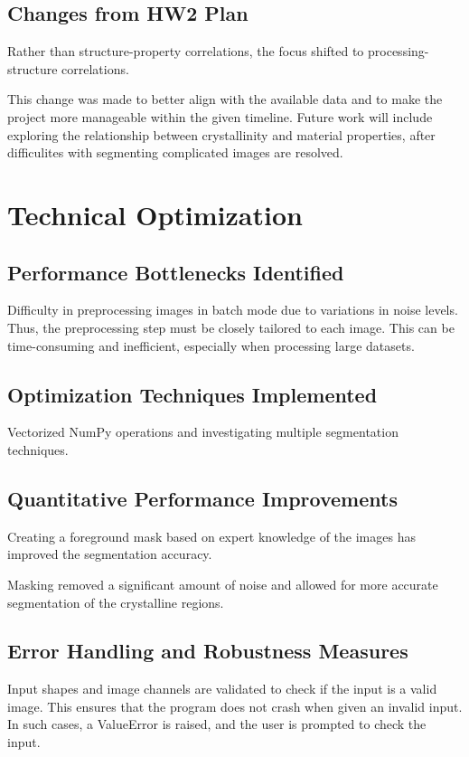 \documentclass[12pt]{article}
\begin{document}
\subsection{Changes from HW2 Plan}
Rather than structure-property correlations, the focus shifted to processing-structure correlations.

This change was made to better align with the available data and to make the project more manageable within the given timeline.
Future work will include exploring the relationship between crystallinity and material properties, after difficulites with 
segmenting complicated images are resolved.

\section{Technical Optimization}

\subsection{Performance Bottlenecks Identified}
Difficulty in preprocessing images in batch mode due to variations in noise levels. Thus, the preprocessing step must be 
closely tailored to each image. This can be time-consuming and inefficient, especially when processing large datasets.

\subsection{Optimization Techniques Implemented}
Vectorized NumPy operations and investigating multiple segmentation techniques.

\subsection{Quantitative Performance Improvements}
Creating a foreground mask based on expert knowledge of the images has improved the segmentation accuracy.

Masking removed a significant amount of noise and allowed for more accurate segmentation of the crystalline regions.

\subsection{Error Handling and Robustness Measures}
Input shapes and image channels are validated to check if the input is a valid image. This ensures that the program does not 
crash when given an invalid input. In such cases, a ValueError is raised, and the user is prompted to check the input.
\end{document}
